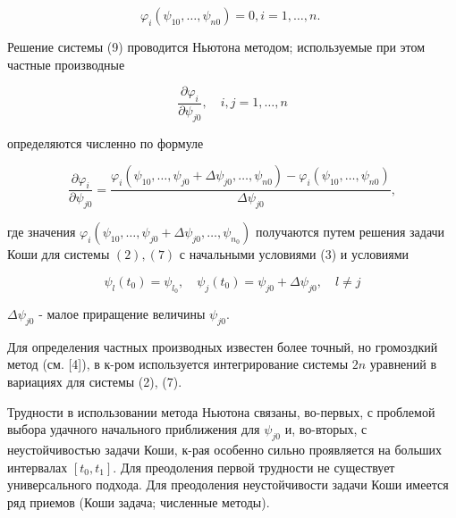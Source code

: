 \documentclass[10pt]{article}
\begin{document}
\[

\varphi_{i}\left(\psi_{10}, \ldots, \psi_{n 0}\right)=0, i=1, \ldots, n \text {. }

\]



Решение системы (9) проводится Ньютона методом; используемые при этом частные производные



\[

\frac{\partial \varphi_{i}}{\partial \psi_{j 0}}, \quad i, j=1, \ldots, n

\]



определяются численно по формуле



\[

\frac{\partial \varphi_{i}}{\partial \psi_{j 0}}=\frac{\varphi_{i}\left(\psi_{10}, \ldots, \psi_{j 0}+\Delta \psi_{j 0}, \ldots, \psi_{n 0}\right)-\varphi_{i}\left(\psi_{10}, \ldots, \psi_{n 0}\right)}{\Delta \psi_{j 0}},

\]



где значения $\varphi_{i}\left(\psi_{10}, \ldots, \psi_{j 0}+\Delta \psi_{j 0}, \ldots, \psi_{n_{0}}\right)$ получаются путем решения задачи Коши для системы $(2),(7)$ с начальными условиями (3) и условиями



\[

\psi_{l}\left(t_{0}\right)=\psi_{l_{0}}, \quad \psi_{j}\left(t_{0}\right)=\psi_{j 0}+\Delta \psi_{j 0}, \quad l \neq j

\]



$\Delta \psi_{j 0}$ - малое приращение величины $\psi_{j 0}$.



Для определения частных производных известен более точный, но громоздкий метод (см. [4]), в к-ром используется интегрирование системы $2 n$ уравнений в вариациях для системы (2), (7).



Трудности в использовании метода Ньютона связаны, во-первых, с проблемой выбора удачного начального приближения для $\psi_{j 0}$ и, во-вторых, с неустойчивостью задачи Коши, к-рая особенно сильно проявляется на больших интервалах $\left[t_{0}, t_{1}\right]$. Для преодоления первой трудности не существует универсального подхода. Для преодоления неустойчивости задачи Коши имеется ряд приемов (Коши задача; численные методы).
\end{document}
